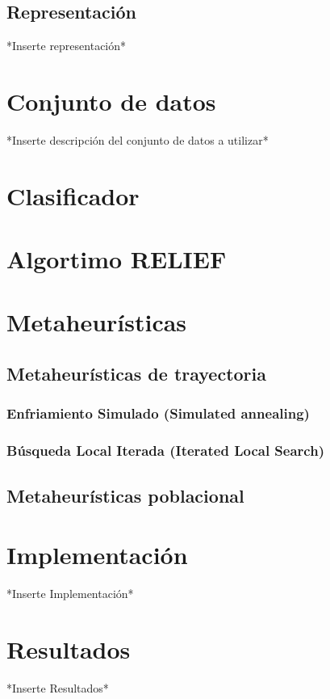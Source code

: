 \documentclass{ci5652}
\begin{document}
\subsection{Representación}
*Inserte representación*

\section{Conjunto de datos}
*Inserte descripción del conjunto de datos a utilizar*

\section{Clasificador}

\section{Algortimo RELIEF}


\section{Metaheurísticas}
\subsection{Metaheurísticas de trayectoria}
\subsubsection{Enfriamiento Simulado (Simulated annealing)}
\subsubsection{Búsqueda Local Iterada (Iterated Local Search)}
\subsection{Metaheurísticas poblacional}

\section{Implementación}
*Inserte Implementación*

\section{Resultados}
*Inserte Resultados*\\
%
\\
%
\\
%
\\
%
\end{document}
